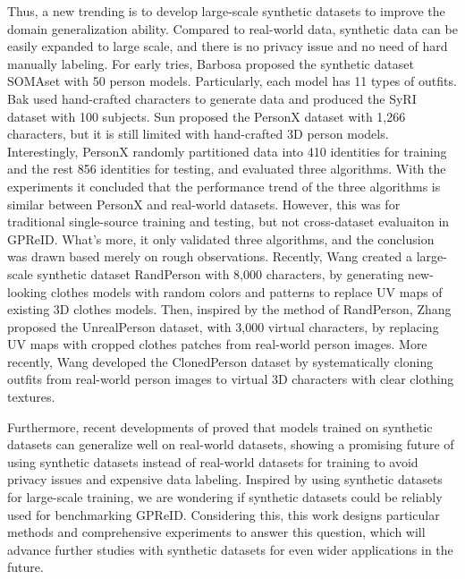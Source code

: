 \documentclass[10pt,twocolumn,letterpaper]{article}
\begin{document}
Thus, a new trending is to develop large-scale synthetic datasets to improve the domain generalization ability. Compared to real-world data, synthetic data can be easily expanded to large scale, and there is no privacy issue and no need of hard manually labeling. 
For early tries, Barbosa \etal \cite{barbosa2018looking} proposed the synthetic dataset SOMAset with 50 person models. Particularly, each model has 11 types of outfits. Bak \etal \cite{bak2018domain} used hand-crafted characters to generate data and produced the SyRI dataset with 100 subjects. Sun \etal \cite{sun2019dissecting} proposed the PersonX dataset with 1,266 characters, but it is still limited with hand-crafted 3D person models. Interestingly, PersonX randomly partitioned data into 410 identities for training and the rest 856 identities for testing, and evaluated three algorithms. With the experiments it concluded that the performance trend of the three algorithms is similar between PersonX and real-world datasets. However, this was for traditional single-source training and testing, but not cross-dataset evaluaiton in GPReID. What's more, it only validated three algorithms, and the conclusion was drawn based merely on rough observations. Recently, Wang \etal \cite{wang20rand} created a large-scale synthetic dataset RandPerson with 8,000 characters, by generating new-looking clothes models with random colors and patterns to replace UV maps of existing 3D clothes models. Then, inspired by the method of RandPerson, Zhang \etal \cite{zhang2021unrealperson} proposed the UnrealPerson dataset, with 3,000 virtual characters, by replacing UV maps with cropped clothes patches from real-world person images. More recently, Wang \etal \cite{Wang-2022-Clonedperson} developed the ClonedPerson dataset by systematically cloning outfits from real-world person images to virtual 3D characters with clear clothing textures. 

Furthermore, recent developments of \cite{wang20rand,zhang2021unrealperson,Wang-2022-Clonedperson} proved that models trained on synthetic datasets can generalize well on real-world datasets, showing a promising future of using synthetic datasets instead of real-world datasets for training to avoid privacy issues and expensive data labeling. Inspired by using synthetic datasets for large-scale training, we are wondering if synthetic datasets could be reliably used for benchmarking GPReID. Considering this, this work designs particular methods and comprehensive experiments to answer this question, which will advance further studies with synthetic datasets for even wider applications in the future.
\end{document}
